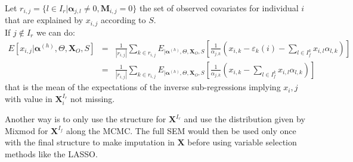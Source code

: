 \documentclass[12pt,a4paper]{report}
\begin{document}
	Let $r_{i,j}=\{l \in I_r| \boldsymbol{\alpha}_{j,l}\neq 0, \boldsymbol{M}_{i,j}=0 \}$ the set of observed covariates for individual $i$ that are explained by $x_{i,j}$ according to $S$.
	\\
	If $j\notin I_r$ we can do:
	\begin{eqnarray}
	E[x_{i,j}|\boldsymbol{\alpha}^{(h)},\Theta,\boldsymbol{X}_O,S]&=&\frac{1}{|r_{i,j}|}\sum_{k \in r_{i,j}}E_{|\boldsymbol{\alpha}^{(h)},\Theta,\boldsymbol{X}_O,S}\left[\frac{1}{\alpha_{j,k}}\left(x_{i,k}-\varepsilon_{k}(i)-\sum_{l \in I_f^k} x_{i,l}\alpha_{l,k}\right)\right] \\
	&=& \frac{1}{|r_{i,j}|}\sum_{k \in r_{i,j}}E_{|\boldsymbol{\alpha}^{(h)},\Theta,\boldsymbol{X}_O,S}\left[\frac{1}{\alpha_{j,k}}\left(x_{i,k}- \sum_{l \in I_f^k} x_{i,l}\alpha_{l,k}\right)\right]
	\end{eqnarray}
	that is the mean of the expectations of the inverse sub-regressions implying $x_i,j$ with value in $\boldsymbol{X}^{I_r}_i$ not missing.



Another way is to only use the structure for $\boldsymbol{X}^{I_r}$ and use the distribution given by Mixmod for $\boldsymbol{X}^{I_f}$ along the MCMC. The full SEM would then be used only once with the final structure to make imputation in $\boldsymbol{X}$ before using variable selection methods like the LASSO.
\end{document}
